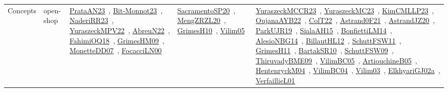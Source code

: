 {\begin{longtable}{lp{3cm}>{\raggedright\arraybackslash}p{6cm}>{\raggedright\arraybackslash}p{6cm}>{\raggedright\arraybackslash}p{8cm}}
Concepts & open-shop & \href{articles/PrataAN23.pdf}{PrataAN23}~\cite{PrataAN23}, \href{papers/Bit-Monnot23.pdf}{Bit-Monnot23}~\cite{Bit-Monnot23}, \href{articles/NaderiRR23.pdf}{NaderiRR23}~\cite{NaderiRR23}, \href{articles/YuraszeckMPV22.pdf}{YuraszeckMPV22}~\cite{YuraszeckMPV22}, \href{articles/AbreuN22.pdf}{AbreuN22}~\cite{AbreuN22}, \href{articles/FahimiOQ18.pdf}{FahimiOQ18}~\cite{FahimiOQ18}, \href{papers/GrimesHM09.pdf}{GrimesHM09}~\cite{GrimesHM09}, \href{papers/MonetteDD07.pdf}{MonetteDD07}~\cite{MonetteDD07}, \href{papers/FocacciLN00.pdf}{FocacciLN00}~\cite{FocacciLN00} & \href{articles/SacramentoSP20.pdf}{SacramentoSP20}~\cite{SacramentoSP20}, \href{articles/MengZRZL20.pdf}{MengZRZL20}~\cite{MengZRZL20}, \href{papers/GrimesH10.pdf}{GrimesH10}~\cite{GrimesH10}, \href{papers/Vilim05.pdf}{Vilim05}~\cite{Vilim05} & \href{articles/YuraszeckMCCR23.pdf}{YuraszeckMCCR23}~\cite{YuraszeckMCCR23}, \href{papers/YuraszeckMC23.pdf}{YuraszeckMC23}~\cite{YuraszeckMC23}, \href{papers/KimCMLLP23.pdf}{KimCMLLP23}~\cite{KimCMLLP23}, \href{papers/OujanaAYB22.pdf}{OujanaAYB22}~\cite{OujanaAYB22}, \href{articles/ColT22.pdf}{ColT22}~\cite{ColT22}, \href{papers/Astrand0F21.pdf}{Astrand0F21}~\cite{Astrand0F21}, \href{articles/AstrandJZ20.pdf}{AstrandJZ20}~\cite{AstrandJZ20}, \href{papers/ParkUJR19.pdf}{ParkUJR19}~\cite{ParkUJR19}, \href{papers/SialaAH15.pdf}{SialaAH15}~\cite{SialaAH15}, \href{papers/BonfiettiLM14.pdf}{BonfiettiLM14}~\cite{BonfiettiLM14}, \href{papers/AlesioNBG14.pdf}{AlesioNBG14}~\cite{AlesioNBG14}, \href{papers/BillautHL12.pdf}{BillautHL12}~\cite{BillautHL12}, \href{articles/SchuttFSW11.pdf}{SchuttFSW11}~\cite{SchuttFSW11}, \href{papers/GrimesH11.pdf}{GrimesH11}~\cite{GrimesH11}, \href{articles/BartakSR10.pdf}{BartakSR10}~\cite{BartakSR10}, \href{papers/SchuttFSW09.pdf}{SchuttFSW09}~\cite{SchuttFSW09}, \href{papers/ThiruvadyBME09.pdf}{ThiruvadyBME09}~\cite{ThiruvadyBME09}, \href{articles/VilimBC05.pdf}{VilimBC05}~\cite{VilimBC05}, \href{papers/ArtiouchineB05.pdf}{ArtiouchineB05}~\cite{ArtiouchineB05}, \href{papers/HentenryckM04.pdf}{HentenryckM04}~\cite{HentenryckM04}, \href{papers/VilimBC04.pdf}{VilimBC04}~\cite{VilimBC04}, \href{papers/Vilim03.pdf}{Vilim03}~\cite{Vilim03}, \href{papers/ElkhyariGJ02a.pdf}{ElkhyariGJ02a}~\cite{ElkhyariGJ02a}, \href{papers/VerfaillieL01.pdf}{VerfaillieL01}~\cite{VerfaillieL01}\\

\end{longtable}}
